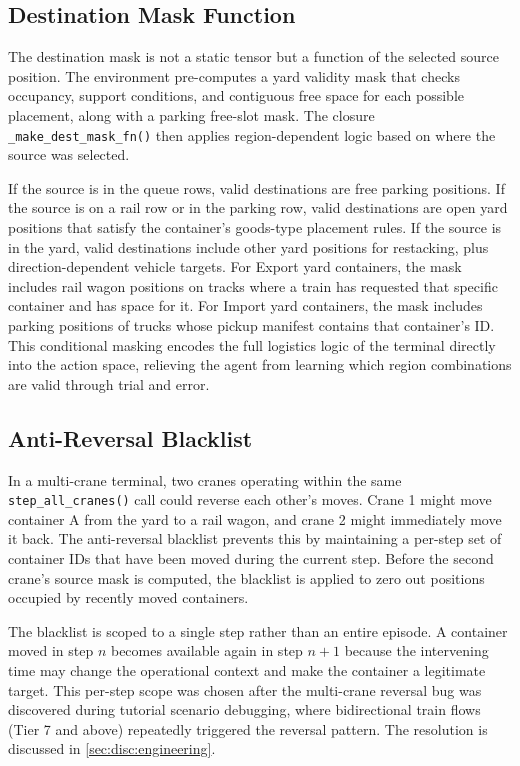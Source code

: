 \subsection{Destination Mask Function}
\label{sec:state:masking:dest}

The destination mask is not a static tensor but a function of the selected source position. The environment pre-computes a yard validity mask that checks occupancy, support conditions, and contiguous free space for each possible placement, along with a parking free-slot mask. The closure \texttt{\_make\_dest\_mask\_fn()} then applies region-dependent logic based on where the source was selected.

If the source is in the queue rows, valid destinations are free parking positions. If the source is on a rail row or in the parking row, valid destinations are open yard positions that satisfy the container's goods-type placement rules. If the source is in the yard, valid destinations include other yard positions for restacking, plus direction-dependent vehicle targets. For Export yard containers, the mask includes rail wagon positions on tracks where a train has requested that specific container and has space for it. For Import yard containers, the mask includes parking positions of trucks whose pickup manifest contains that container's ID. This conditional masking encodes the full logistics logic of the terminal directly into the action space, relieving the agent from learning which region combinations are valid through trial and error.

\subsection{Anti-Reversal Blacklist}
\label{sec:state:masking:blacklist}

In a multi-crane terminal, two cranes operating within the same \texttt{step\_all\_cranes()} call could reverse each other's moves. Crane 1 might move container A from the yard to a rail wagon, and crane 2 might immediately move it back. The anti-reversal blacklist prevents this by maintaining a per-step set of container IDs that have been moved during the current step. Before the second crane's source mask is computed, the blacklist is applied to zero out positions occupied by recently moved containers.

The blacklist is scoped to a single step rather than an entire episode. A container moved in step $n$ becomes available again in step $n + 1$ because the intervening time may change the operational context and make the container a legitimate target. This per-step scope was chosen after the multi-crane reversal bug was discovered during tutorial scenario debugging, where bidirectional train flows (Tier 7 and above) repeatedly triggered the reversal pattern. The resolution is discussed in \cref{sec:disc:engineering}.

